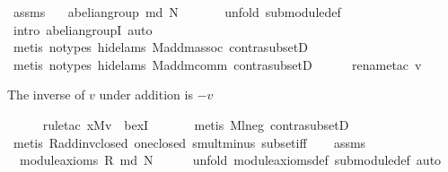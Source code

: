 \begin{isabellebody}
\ assms\ \isamarkupfalse%
\ {}{\isacharcolon}\ {\isachardoublequoteopen}abelian{\isacharunderscore}group\ {\isacharparenleft}md\ N{\isacharparenright}{\isachardoublequoteclose}\ \isanewline
\ \ \ \ \isamarkupfalse%
\ {\isacharparenleft}unfold\ submodule{\isacharunderscore}def{\isacharparenright}\isanewline
\ \ \ \ \isamarkupfalse%
\ {\isacharparenleft}intro\ abelian{\isacharunderscore}groupI{\isacharcomma}\ auto{\isacharparenright}\isanewline
\ \ \ \ \ \ \isamarkupfalse%
\ {\isacharparenleft}metis\ {\isacharparenleft}no{\isacharunderscore}types{\isacharcomma}\ hide{\isacharunderscore}lams{\isacharparenright}\ M{\isachardot}add{\isachardot}m{\isacharunderscore}assoc\ contra{\isacharunderscore}subsetD{\isacharparenright}\isanewline
\ \ \ \ \ \isamarkupfalse%
\ {\isacharparenleft}metis\ {\isacharparenleft}no{\isacharunderscore}types{\isacharcomma}\ hide{\isacharunderscore}lams{\isacharparenright}\ M{\isachardot}add{\isachardot}m{\isacharunderscore}comm\ contra{\isacharunderscore}subsetD{\isacharparenright}\isanewline
\ \ \ \ \isamarkupfalse%
\ {\isacharparenleft}rename{\isacharunderscore}tac\ v{\isacharparenright}%
\begin{isamarkuptxt}%
The inverse of $v$ under addition is $-v$%
\end{isamarkuptxt}%
\isamarkuptrue%
\ \ \ \ \isamarkupfalse%
\ {\isacharparenleft}rule{\isacharunderscore}tac\ x{\isacharequal}{\isachardoublequoteopen}{\isasymominus}\isactrlbsub M\isactrlesub v{\isachardoublequoteclose}\ \ bexI{\isacharparenright}\isanewline
\ \ \ \ \ \isamarkupfalse%
\ {\isacharparenleft}metis\ M{\isachardot}l{\isacharunderscore}neg\ contra{\isacharunderscore}subsetD{\isacharparenright}\isanewline
\ \ \ \ \isamarkupfalse%
\ {\isacharparenleft}metis\ R{\isachardot}add{\isachardot}inv{\isacharunderscore}closed\ one{\isacharunderscore}closed\ smult{\isacharunderscore}minus{\isacharunderscore}{}\ subset{\isacharunderscore}iff{\isacharparenright}\isanewline
{}\isamarkupfalse%
\isanewline
\ \ \isamarkupfalse%
\ assms\ \isamarkupfalse%
\ {}{\isacharcolon}\ {\isachardoublequoteopen}module{\isacharunderscore}axioms\ R\ {\isacharparenleft}md\ N{\isacharparenright}{\isachardoublequoteclose}\isanewline
\ \ \ \ \isamarkupfalse%
\ {\isacharparenleft}unfold\ module{\isacharunderscore}axioms{\isacharunderscore}def\ submodule{\isacharunderscore}def{\isacharcomma}\ auto{\isacharparenright}\isanewline

\end{isabellebody}
